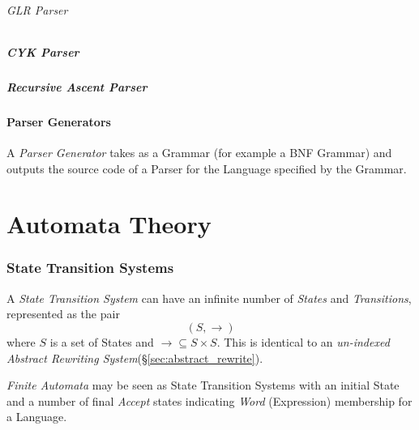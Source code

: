 \documentclass{article}
\begin{document}
\paragraph{GLR Parser}

\subsubsection{CYK Parser}

\subsubsection{Recursive Ascent Parser}

\subsection{Parser Generators}\label{subsec:parser_generator}

A \emph{Parser Generator} takes as a Grammar (for example a BNF
Grammar) and outputs the source code of a Parser for the Language
specified by the Grammar.

\part{Automata Theory}\label{sec:automata_theory}

\section{State Transition Systems} \label{sec:state_transition_system}
A \emph{State Transition System} can have an infinite number of
\emph{States} and \emph{Transitions}, represented as the pair
\[
    (S,\rightarrow)
\]
where $S$ is a set of States and $\rightarrow \subseteq S \times
S$. This is identical to an \emph{un-indexed Abstract Rewriting
  System}(\S \ref{sec:abstract_rewrite}).

\emph{Finite Automata} may be seen as State Transition Systems with an
initial State and a number of final \emph{Accept} states indicating
\emph{Word} (Expression) membership for a Language.
\end{document}
